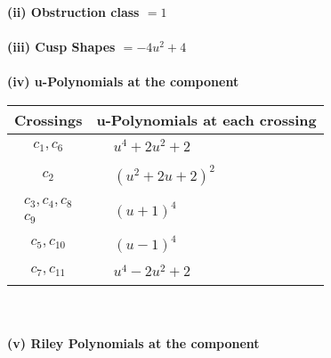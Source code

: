 \documentclass[1p]{elsarticle_modified}
\theoremstyle{definition}
\begin{document}
\flushleft \textbf{(ii) Obstruction class $= 1$}\\~\\
\flushleft \textbf{(iii) Cusp Shapes $= -4 u^2+4$}\\~\\
\newpage\renewcommand{\arraystretch}{1}
\flushleft \textbf{(iv) u-Polynomials at the component}\newline \\
\begin{tabular}{m{50pt}|m{274pt}}
Crossings & \hspace{64pt}u-Polynomials at each crossing \\
\hline $$\begin{aligned}c_{1},c_{6}\end{aligned}$$&$\begin{aligned}
&u^4+2 u^2+2
\end{aligned}$\\
\hline $$\begin{aligned}c_{2}\end{aligned}$$&$\begin{aligned}
&(u^2+2 u+2)^2
\end{aligned}$\\
\hline $$\begin{aligned}c_{3},c_{4},c_{8}\\c_{9}\end{aligned}$$&$\begin{aligned}
&(u+1)^4
\end{aligned}$\\
\hline $$\begin{aligned}c_{5},c_{10}\end{aligned}$$&$\begin{aligned}
&(u-1)^4
\end{aligned}$\\
\hline $$\begin{aligned}c_{7},c_{11}\end{aligned}$$&$\begin{aligned}
&u^4-2 u^2+2
\end{aligned}$\\
\hline
\end{tabular}\\~\\
\newpage\renewcommand{\arraystretch}{1}
\flushleft \textbf{(v) Riley Polynomials at the component}\newline \\
\end{document}
